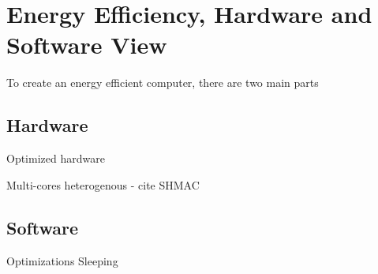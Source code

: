 \chapter{Energy Efficiency, Hardware and Software View}
\label{ch:chapter2}

To create an energy efficient computer, there are two main parts 

\section{Hardware}
Optimized hardware

Multi-cores heterogenous - cite SHMAC

\section{Software}
Optimizations 
Sleeping